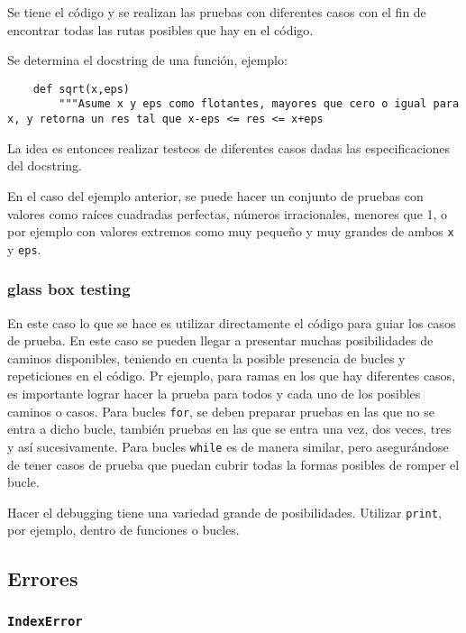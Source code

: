 Se tiene el código y se realizan las pruebas con diferentes casos con el fin de
encontrar todas las rutas posibles que hay en el código.

Se determina el docstring de una función, ejemplo: \\

\begin{verbatim}
    def sqrt(x,eps)
        """Asume x y eps como flotantes, mayores que cero o igual para x, y retorna un res tal que x-eps <= res <= x+eps
\end{verbatim}

La idea es entonces realizar testeos de diferentes casos dadas las
especificaciones del docstring.

En el caso del ejemplo anterior, se puede hacer un conjunto de pruebas con
valores como raíces cuadradas perfectas, números irracionales, menores que 1, o
por ejemplo con valores extremos como muy pequeño y muy grandes de ambos
\texttt{x} y \texttt{eps}.

\subsubsection{glass box testing}

En este caso lo que se hace es utilizar directamente el código para guiar los
casos de prueba. En este caso se pueden llegar a presentar muchas posibilidades
de caminos disponibles, teniendo en cuenta la posible presencia de bucles y
repeticiones en el código.
Pr ejemplo, para ramas en los que hay diferentes casos, es importante lograr
hacer la prueba para todos y cada uno de los posibles caminos o casos. Para
bucles \texttt{for}, se deben preparar pruebas en las que no se entra a dicho
bucle, también pruebas en las que se entra una vez, dos veces, tres y así
sucesivamente. Para bucles \texttt{while} es de manera similar, pero
asegurándose de tener casos de prueba que puedan cubrir todas la formas
posibles de romper el bucle.

Hacer el debugging tiene una variedad grande de posibilidades. Utilizar
\texttt{print}, por ejemplo, dentro de funciones o bucles.

\subsection{Errores}

\subsubsection{\texttt{IndexError}}

